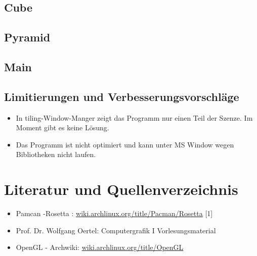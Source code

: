 \documentclass[12pt]{article}
\begin{document}
\subsection{Cube}


\subsection{Pyramid}


\subsection{Main}


\subsection{Limitierungen und Verbesserungsvorschläge}
\begin{itemize}
	\item In tiling-Window-Manger zeigt das Programm nur einen Teil der Szenze. Im Moment gibt es keine Lösung.
	\item Das Programm ist nicht optimiert und kann unter MS Window wegen Bibliotheken nicht laufen.
\end{itemize}

\section{Literatur und Quellenverzeichnis}
\begin{itemize}
	\item Pamcan -Rosetta : \url{wiki.archlinux.org/title/Pacman/Rosetta} \label{sec:pacman} [1]
	\item Prof. Dr. Wolfgang Oertel: Computergrafik I Vorlesungsmaterial
	\item OpenGL - Archwiki: \url{wiki.archlinux.org/title/OpenGL}
\end{itemize}
\end{document}

